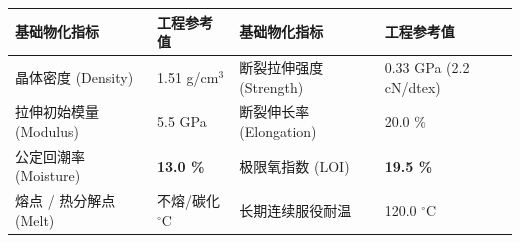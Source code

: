 \documentclass[11pt,openright,twoside,UTF8]{ctexbook}
\begin{document}
\vspace{0.15cm}
\begin{center}
\small
\begin{tabularx}{\textwidth}{p{3.8cm}Xp{3.8cm}X}
\toprule
\textbf{基础物化指标} & \textbf{工程参考值} & \textbf{基础物化指标} & \textbf{工程参考值} \\
\midrule
晶体密度 (Density) & 1.51 g/cm$^3$ & 断裂拉伸强度 (Strength) & 0.33 GPa (2.2 cN/dtex) \\
拉伸初始模量 (Modulus) & 5.5 GPa & 断裂伸长率 (Elongation) & 20.0 \% \\
公定回潮率 (Moisture) & \textbf{13.0 \%} & 极限氧指数 (LOI) & \textbf{19.5 \%} \\
熔点 / 热分解点 (Melt) & 不熔/碳化 $^\circ\mathrm{C}$ & 长期连续服役耐温 & 120.0 $^\circ\mathrm{C}$ \\
\bottomrule
\end{tabularx}
\end{center}
\vspace{0.15cm}
\end{document}
